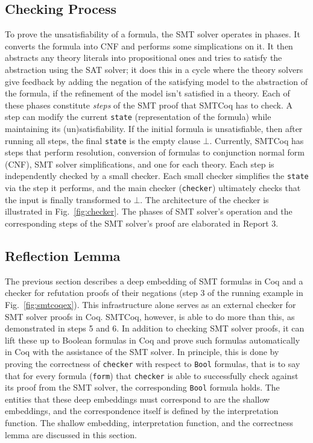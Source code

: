 \documentclass{article}
\begin{document}
	\subsection{Checking Process}
	To prove the unsatisfiability of a 
	formula, the SMT solver operates in 
	phases. It converts the formula into
	CNF and performs some simplications
	on it. It then abstracts any theory
	literals into propositional ones 
	and tries to satisfy the abstraction 
	using the SAT solver; it does this
	in a cycle where the theory
	solvers give feedback
	by adding the negation of the 
	satisfying model to the 
	abstraction of the formula, if the 
	refinement of the model isn't 
	satisfied in a theory. 
	Each of these phases constitute
	\textit{steps} of the SMT proof
	that SMTCoq has to check. A step
	can modify the current 
	\texttt{state} (representation of 
	the formula) while maintaining 
	its (un)satisfiability. If the 
	initial formula is unsatisfiable, 
	then after running all steps,
	the final \texttt{state} is the 
	empty clause $\bot$. Currently, 
	SMTCoq has steps that perform 
	resolution, conversion of formulas 
	to conjunction normal form (CNF), SMT 
	solver simplifications, and one for 
	each theory. Each step is 
	independently checked by a small 
	checker. Each small
	checker simplifies the  
	\texttt{state} via the step it 
	performs, and the main checker 
	(\texttt{checker}) ultimately checks 
	that the input is 
	finally transformed to $\bot$. The 
	architecture of the checker is 
	illustrated in
	Fig.~\ref{fig:checker}. The phases 
	of SMT solver's operation and the 
	corresponding steps of the
	SMT solver's proof are elaborated
	in Report 3.
	
	\subsection{Reflection Lemma}
	\label{sec:refl}
	The previous section describes a 
	deep embedding of SMT formulas 
	in Coq and a checker for 
	refutation proofs of their 
	negations (step 3 of 
	the running example in 
	Fig.~\ref{fig:smtcoqex}). 
	This infrastructure alone serves 
	as an external checker for 
	SMT solver proofs in Coq.
	SMTCoq, however, is able to 
	do more than this, as demonstrated
	in steps 5 and 6. In addition 
	to checking SMT solver proofs, 
	it can lift these up to 
	Boolean formulas in Coq and
	prove such formulas automatically
	in Coq with the assistance of 
	the SMT solver. In principle,
	this is done by proving the
	correctness of \texttt{checker}
	with respect to \texttt{Bool}
	formulas, that is to say that 
	for every formula (\texttt{form})
	that \texttt{checker} is able to 
	successfully check against its
	proof from the SMT solver, the 
	corresponding \texttt{Bool}
	formula holds. The entities
	that these deep embeddings 
	must correspond to are the shallow
	embeddings, and the correspondence 
	itself is defined by the 
	interpretation function. The 
	shallow embedding, interpretation
	function, and the correctness 
	lemma are discussed in this 
	section.
	
\end{document}
